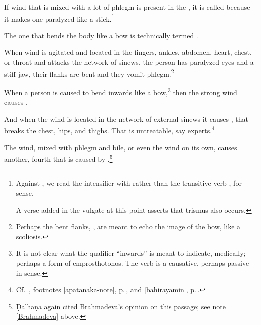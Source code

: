 \begin{translation}
\item[52cd--53ab] 

If wind that is mixed with a lot of phlegm is present in
the , it is called  because it makes one paralyzed like a stick.\footnote{Against
    , we read the intensifier  with 
     rather
    than the transitive verb , for sense.
    
    A verse added in the vulgate at this point asserts that trismus also occurs.}
    
\item[54ab]

The one that bends the body like a bow is technically termed
. 

\item[54cd--55cd]

When wind is agitated and located in the fingers, ankles, abdomen, heart, chest, 
or throat and attacks the network of sinews, the person has paralyzed eyes and 
a stiff jaw, their flanks are bent and they vomit phlegm.\footnote{Perhaps 
    the bent flanks, , are meant to echo the image of the 
    bow, like a scoliosis.}

\item[56]

When a person is caused to bend inwards like a bow,\footnote{It is not
    clear what the qualifier “inwards” is meant to indicate, medically;
    perhaps a form of emprosthotonos.  The verb  is a
    causative, perhaps passive in sense.} then the strong wind causes
    .

\item[57]

And when the wind is located in the network of external sinews it
causes , that breaks the chest, hips,
and thighs. That is untreatable, say experts.\footnote{\label{bāhyāyāma}Cf.\ , footnotes \ref{apatānaka-note}, p.\,\pageref{apatānaka-note},  and \ref{bahirāyāmin}, p.\,\pageref{bahirāyāmin}.}

\item[58]

The wind, mixed with phlegm and bile, or even the wind on its own, causes  
another, fourth  that is caused by 
.\footnote{Ḍalhaṇa again cited Brahmadeva's opinion 
on this passage; see note \ref{Brahmadeva} above.}


\end{translation}
